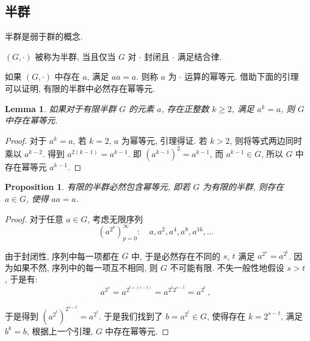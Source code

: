 \documentclass[UTF8]{ctexart}
\theoremstyle{mystyle}
\newtheorem{lemma}{Lemma}[section]
\newtheorem{proposition}{Proposition}[section]
\theoremstyle{myremark}
\theoremstyle{plain}
\begin{document}
\subsection{半群}
半群是弱于群的概念.
\begin{definition}[\text{半群}]
    $ (G, \cdot) $ 被称为半群, 当且仅当 $ G $ 对 $ \cdot $ 封闭且 $ \cdot $ 满足结合律.
\end{definition}

如果 $ (G, \cdot) $ 中存在 $ a $, 满足 $ a a = a $. 则称 $ a $ 为 $ \cdot $ 运算的幂等元. 借助下面的引理可以证明, 有限的半群中必然存在幂等元.

\begin{lemma}
    如果对于有限半群 $ G $ 的元素 $ a $, 存在正整数 $ k \geqslant 2 $, 满足 $ a^k = a $, 则 $ G $ 中存在幂等元.
\end{lemma}

\begin{proof}
    对于 $ a^k = a $, 若 $ k = 2 $, $ a $ 为幂等元, 引理得证. 若 $ k > 2 $, 则将等式两边同时乘以 $ a^{k - 2} $. 得到 $ a^{2(k - 1)} = a^{k - 1} $. 即 $ \left( a^{k - 1} \right)^2 = a^{k - 1} $, 而 $ a^{k - 1} \in G $, 所以 $ G $ 中存在幂等元 $ a^{k - 1} $.
\end{proof}

\begin{proposition}
    有限的半群必然包含幂等元, 即若 $ G $ 为有限的半群, 则存在 $ a \in G $, 使得 $ aa = a $.
\end{proposition}

\begin{proof}
    对于任意 $ a \in G $, 考虑无限序列 \[ \left( a^{2^p} \right)_{p = 0}^\infty \colon \quad a, a^2, a^4, a^8, a^{16}, \dots \]

    由于封闭性, 序列中每一项都在 $ G $ 中, 于是必然存在不同的 $ s $, $ t $ 满足 $ a^{\displaystyle 2^s} = a^{\displaystyle 2^t} $. 因为如果不然, 序列中的每一项互不相同, 则 $ G $ 不可能有限. 不失一般性地假设 $ s > t $, 于是有: \[ a^{\displaystyle 2^{s}} = a^{\displaystyle 2^{t + (s - t)}} = a^{\displaystyle 2^{t} 2^{\displaystyle s - t}} = a^{\displaystyle 2^t} \,,\]

    于是得到 $ \left( a^{\displaystyle 2^t} \right)^{\displaystyle 2^{s - t}} = a^{\displaystyle 2^t} $. 于是我们找到了 $ b = a^{\displaystyle 2^t} \in G $, 使得存在 $ k = 2^{s - t} $, 满足 $ b^k = b $, 根据上一个引理, $ G $ 中存在幂等元.
\end{proof}
\end{document}
